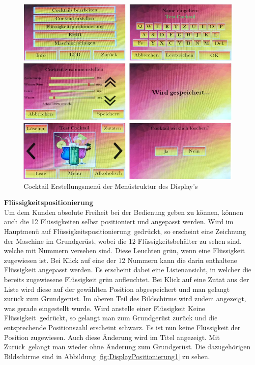 \begin{figure}[H]
	\centering
	\includegraphics[width=\textwidth]{graphics/DisplayErstellen}
	\caption{Cocktail Erstellungsmenü der Menüstruktur des Display's \cite{noauthor_cocktail_nodate-2}}
	\label{fig:DisplayErstellen}
\end{figure}

\textbf{Flüssigkeitspositionierung}\\
Um dem Kunden absolute Freiheit bei der Bedienung geben zu können, können auch die 12 Flüssigkeiten selbst positioniert und angepasst werden. Wird im Hauptmenü auf \flqq Flüssigkeitspositionierung\frqq~gedrückt, so erscheint eine Zeichnung der Maschine im Grundgerüst, wobei die 12 Flüssigkeitsbehälter zu sehen sind, welche mit Nummern versehen sind. Diese Leuchten grün, wenn eine Flüssigkeit zugewiesen ist. Bei Klick auf eine der 12 Nummern kann die darin enthaltene Flüssigkeit angepasst werden. Es erscheint dabei eine Listenansicht, in welcher die bereits zugewiesene Flüssigkeit grün aufleuchtet. Bei Klick auf eine Zutat aus der Liste wird diese auf der gewählten Position abgespeichert und man gelangt zurück zum Grundgerüst. Im oberen Teil des Bildschirms wird zudem angezeigt, was gerade eingestellt wurde. Wird anstelle einer Flüssigkeit \flqq Keine Flüssigkeit\frqq~gedrückt, so gelangt man zum Grundgerüst zurück und die entsprechende Positionszahl erscheint schwarz. Es ist nun keine Flüssigkeit der Position zugewiesen. Auch diese Änderung wird im Titel angezeigt. Mit \flqq Zurück\frqq~gelangt man wieder ohne Änderung zum Grundgerüst. Die dazugehörigen Bildschirme sind in Abbildung \ref{fig:DisplayPositionierung1} zu sehen. 

